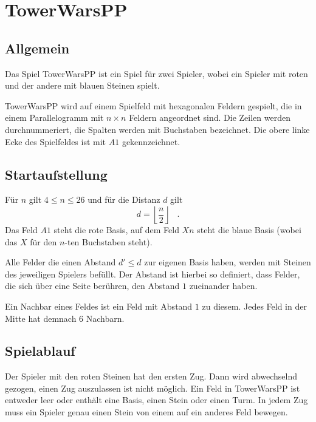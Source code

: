 \section*{TowerWarsPP}
\newcommand{\myAlph}[1]{\char\numexpr`A-1+#1\relax}
\newcommand{\myalph}[1]{\char\numexpr`a-1+#1\relax}

\subsection*{Allgemein}
Das Spiel TowerWarsPP ist ein Spiel für zwei Spieler, wobei ein Spieler mit roten und der andere mit blauen Steinen spielt.

TowerWarsPP wird auf einem Spielfeld mit hexagonalen Feldern gespielt, die in einem Parallelogramm mit $n \times n$ Feldern angeordnet sind. Die Zeilen werden durchnummeriert, die Spalten werden mit Buchstaben bezeichnet. Die obere linke Ecke des Spielfeldes ist mit $A1$ gekennzeichnet.

\subsection*{Startaufstellung}
Für $n$ gilt $4 \le n \le 26$ und für die Distanz $d$ gilt 
\[d = \left\lfloor \frac{n}{2}\right\rfloor\hspace{10pt}.\] 
Das Feld $A1$ steht die rote Basis, auf dem Feld $Xn$ steht die blaue Basis (wobei das $X$ für den $n$-ten Buchstaben steht). 

Alle Felder die einen Abstand $d' \le d$ zur eigenen Basis haben, werden mit Steinen des jeweiligen Spielers befüllt. Der Abstand ist hierbei so definiert, dass Felder, die sich über eine Seite berühren, den Abstand $1$ zueinander haben.


Ein Nachbar eines Feldes ist ein Feld mit Abstand $1$ zu diesem. Jedes Feld in der Mitte hat demnach $6$ Nachbarn.

\subsection*{Spielablauf}
Der Spieler mit den roten Steinen hat den ersten Zug. Dann wird abwechselnd gezogen, einen Zug auszulassen ist nicht möglich. Ein Feld in TowerWarsPP ist entweder leer oder enthält eine Basis, einen Stein oder einen Turm. In jedem Zug muss ein Spieler genau einen Stein von einem auf ein anderes Feld bewegen.

